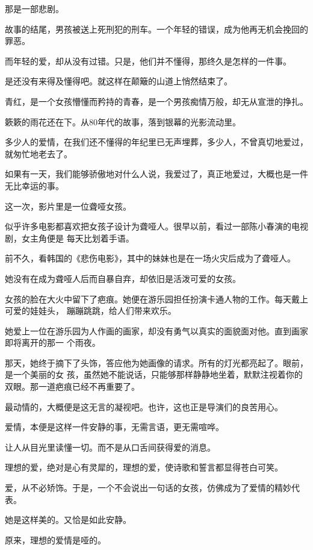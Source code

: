 \documentclass[12pt,a4paper]{article}
\def\blankrev{\vspace{1ex}}									%
\begin{document}
		那是一部悲剧。\par
		故事的结尾，男孩被送上死刑犯的刑车。一个年轻的错误，成为他再无机会挽回的罪恶。\par
		而年轻的爱，却从没有过错。只是，他们并不懂得，那终久是怎样的一件事。\par
		是还没有来得及懂得吧。就这样在颠簸的山道上悄然结束了。\par
		青红，是一个女孩懵懂而矜持的青春，是一个男孩痴情万般，却无从宣泄的挣扎。

		簌簌的雨花还在下。从80年代的故事，落到银幕的光影流动里。

		多少人的爱情，在我们还不懂得的年纪里已无声埋葬，多少人，不曾真切地爱过，就匆忙地老去了。

		如果有一天，我们能够骄傲地对什么人说，我爱过了，真正地爱过，大概也是一件无比幸运的事。

		这一次，影片里是一位聋哑女孩。

		似乎许多电影都喜欢把女孩子设计为聋哑人。很早以前，看过一部陈小春演的电视剧，女主角便是
	每天比划着手语。

		前不久，看韩国的《悲伤电影》，其中的妹妹也是在一场火灾后成为了聋哑人。

		她没有在成为聋哑人后而自暴自弃，却依旧是活泼可爱的女孩。

		女孩的脸在大火中留下了疤痕。她便在游乐园担任扮演卡通人物的工作。每天戴上可爱的娃娃头，
	蹦蹦跳跳，给人们带来欢乐。

		她爱上一位在游乐园为人作画的画家，却没有勇气以真实的面貌面对他。直到画家即将离开的那一
	个雨夜。

		那天，她终于摘下了头饰，答应他为她画像的请求。所有的灯光都亮起了。眼前，是一个美丽的女
	孩，虽然她不能说话，只能够那样静静地坐着，默默注视着你的双眼。那一道疤痕已经不再重要了。

		最动情的，大概便是这无言的凝视吧。也许，这也正是导演们的良苦用心。

		爱情，本便是这样一件安静的事，无需言语，更无需喧哗。\par
		让人从目光里读懂一切。而不是从口舌间获得爱的消息。\par
		理想的爱，绝对是心有灵犀的，理想的爱，使诗歌和誓言都显得苍白可笑。\par
		爱，从不必矫饰。于是，一个不会说出一句话的女孩，仿佛成为了爱情的精妙代表。\par
		她是这样美的。又恰是如此安静。

		\blankrev
		原来，理想的爱情是哑的。

	\endwriting


\end{document}
